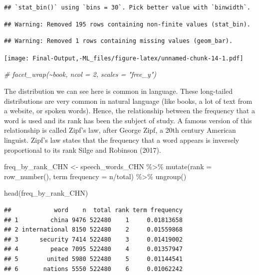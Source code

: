 \documentclass[
]{article}
\newenvironment{Shaded}{\begin{snugshade}}{\end{snugshade}}
\newcommand{\AttributeTok}[1]{\textcolor[rgb]{0.77,0.63,0.00}{#1}}
\newcommand{\CommentTok}[1]{\textcolor[rgb]{0.56,0.35,0.01}{\textit{#1}}}
\newcommand{\FunctionTok}[1]{\textcolor[rgb]{0.00,0.00,0.00}{#1}}
\newcommand{\NormalTok}[1]{#1}
\newcommand{\OtherTok}[1]{\textcolor[rgb]{0.56,0.35,0.01}{#1}}
\newcommand{\SpecialCharTok}[1]{\textcolor[rgb]{0.00,0.00,0.00}{#1}}
\newcommand{\StringTok}[1]{\textcolor[rgb]{0.31,0.60,0.02}{#1}}
\begin{document}
\begin{verbatim}
## `stat_bin()` using `bins = 30`. Pick better value with `binwidth`.
\end{verbatim}

\begin{verbatim}
## Warning: Removed 195 rows containing non-finite values (stat_bin).
\end{verbatim}

\begin{verbatim}
## Warning: Removed 1 rows containing missing values (geom_bar).
\end{verbatim}

\texttt{[image: Final-Output,-ML\_files/figure-latex/unnamed-chunk-14-1.pdf]}

\begin{Shaded}
\begin{Highlighting}[]
\CommentTok{\#  facet\_wrap(\textasciitilde{}book, ncol = 2, scales = "free\_y")}
\end{Highlighting}
\end{Shaded}

The distribution we can see here is common in language. These
long-tailed distributions are very common in natural language (like
books, a lot of text from a website, or spoken words). Hence, the
relationship between the frequency that a word is used and its rank has
been the subject of study. A famous version of this relationship is
called Zipf's law, after George Zipf, a 20th century American linguist.
Zipf's law states that the frequency that a word appears is inversely
proportional to its rank Silge and Robinson (2017).

\begin{Shaded}
\begin{Highlighting}[]
\NormalTok{freq\_by\_rank\_CHN }\OtherTok{\textless{}{-}}\NormalTok{ speech\_words\_CHN }\SpecialCharTok{\%\textgreater{}\%} 
  \FunctionTok{mutate}\NormalTok{(}\AttributeTok{rank =} \FunctionTok{row\_number}\NormalTok{(), }
         \StringTok{\textasciigrave{}}\AttributeTok{term frequency}\StringTok{\textasciigrave{}} \OtherTok{=}\NormalTok{ n}\SpecialCharTok{/}\NormalTok{total) }\SpecialCharTok{\%\textgreater{}\%}
  \FunctionTok{ungroup}\NormalTok{()}

\FunctionTok{head}\NormalTok{(freq\_by\_rank\_CHN)}
\end{Highlighting}
\end{Shaded}

\begin{verbatim}
##            word    n  total rank term frequency
## 1         china 9476 522480    1     0.01813658
## 2 international 8150 522480    2     0.01559868
## 3      security 7414 522480    3     0.01419002
## 4         peace 7095 522480    4     0.01357947
## 5        united 5980 522480    5     0.01144541
## 6       nations 5550 522480    6     0.01062242
\end{verbatim}
\end{document}
